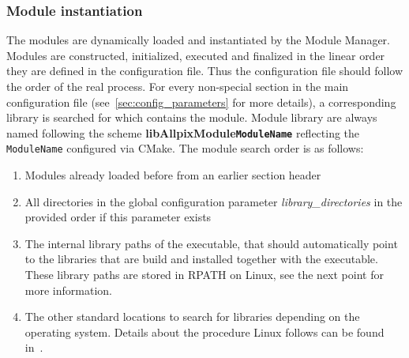 \subsubsection{Module instantiation}
\label{sec:module_instantiation}
The modules are dynamically loaded and instantiated by the Module Manager.
Modules are constructed, initialized, executed and finalized in the linear order they are defined in the configuration file.
Thus the configuration file should follow the order of the real process.
For every non-special section in the main configuration file (see~\ref{sec:config_parameters} for more details), a corresponding library is searched for which contains the module.
Module library are always named following the scheme \textbf{libAllpixModule\texttt{ModuleName}} reflecting the \texttt{ModuleName} configured via CMake.
The module search order is as follows:
\begin{enumerate}
\item Modules already loaded before from an earlier section header
\item All directories in the global configuration parameter \textit{library\_directories} in the provided order if this parameter exists
\item The internal library paths of the executable, that should automatically point to the libraries that are build and installed together with the executable.
These library paths are stored in RPATH on Linux, see the next point for more information.
\item The other standard locations to search for libraries depending on the operating system.
Details about the procedure Linux follows can be found in~\cite{linuxld}.
\end{enumerate}

